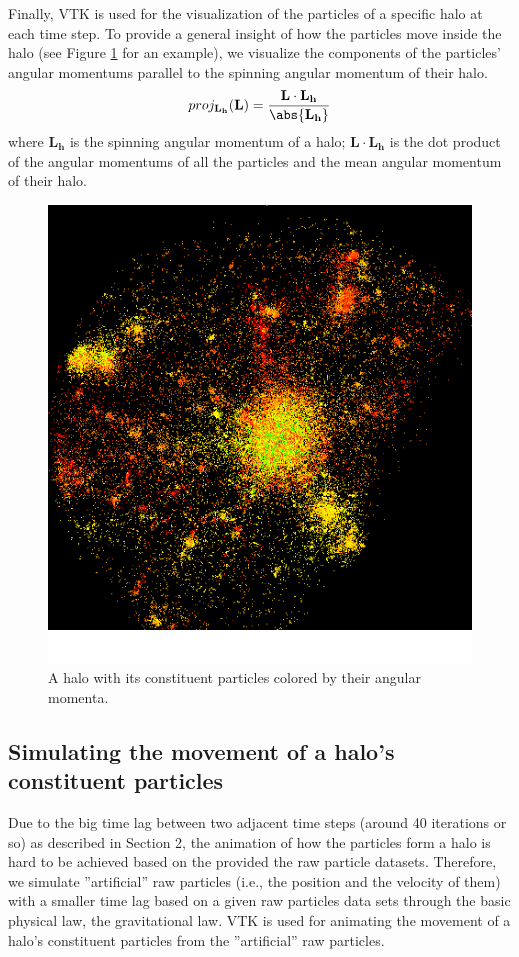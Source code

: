\documentclass[12pt]{article}
\renewcommand{\vec}[1]{\mathbf{#1}}
\begin{document}
Finally, VTK is used for the visualization of the particles of a specific halo
at each time step. To provide a general insight of how the particles move inside 
the halo (see Figure \ref{fig:halo_particles} for an example), we visualize the 
components of the particles' angular momentums parallel to the spinning angular 
momentum of their halo.
\begin{equation}
proj_{\vec{L_h}}(\vec{L}) = \frac{\vec{L} \cdot \vec{L_h}}{\abs{\vec{L_h}}}
\end{equation}
where $\vec{L_h}$ is the spinning angular momentum of a halo; $\vec{L} \cdot \vec{L_h}$
is the dot product of the angular momentums of all the particles and the mean 
angular momentum of their halo.

\begin{figure}[htp]
\centering
\includegraphics[width=0.5\columnwidth]{../figures/halo_particles.png}
\caption{A halo with its constituent particles colored by their angular momenta.}
\label{fig:halo_particles}
\end{figure}

\subsection{Simulating the movement of a halo's constituent particles}
Due to the big time lag between two adjacent time steps (around 40 iterations
or so) as described in Section 2, the animation of how the particles form a halo
is hard to be achieved based on the provided the raw particle datasets. Therefore, 
we simulate ''artificial'' raw particles (i.e., the position and the velocity of 
them) with a smaller time lag based on a given raw particles data sets through the
basic physical law, the gravitational law. VTK is used for animating the movement 
of a halo's constituent particles from the ''artificial'' raw particles.
\end{document}
